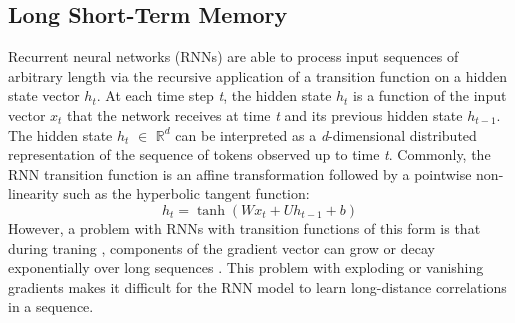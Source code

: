 \documentclass[letterpaper]{article}
\begin{document}
\subsection{Long Short-Term Memory}
Recurrent neural networks (RNNs) are able to process input sequences of arbitrary length via the recursive application of a transition function on a hidden state vector \textit{$h_{t}$}. At each time step \textit{t}, the hidden state \textit{$h_{t}$} is a function of the input vector \textit{$x_{t}$} that the network receives at time \textit{t} and its previous hidden state \textit{$h_{t-1}$}. The hidden state \textit{$h_{t}$} $\in$ $\mathbb{R}^{d}$ can be interpreted as a \textit{d}-dimensional distributed representation of the sequence of tokens observed up to time \textit{t}. Commonly, the RNN transition function is an affine transformation followed by a pointwise non-linearity such as the hyperbolic tangent function:
\begin{equation}\label{rnn}
h_{t} = \tanh(Wx_{t}+Uh_{t-1}+b)
\end{equation}
However, a problem with RNNs with transition functions of this form is that during traning , components of the gradient vector can grow or decay exponentially over long sequences \cite{Hochreiter:1998:VGP:353515.355233}. This problem with exploding or vanishing gradients makes it difficult for the RNN model to learn long-distance correlations in a sequence.
\end{document}
